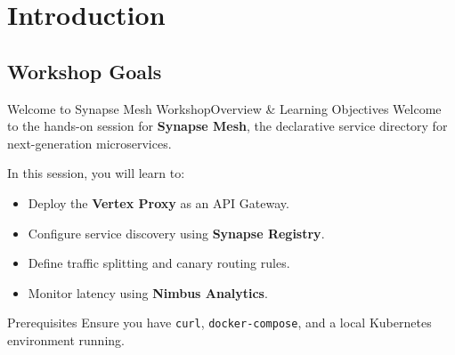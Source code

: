 \section{Introduction}
\subsection{Workshop Goals}

\begin{frame}{Welcome to Synapse Mesh Workshop}{Overview \& Learning Objectives}
  Welcome to the hands-on session for \textbf{Synapse Mesh}, the declarative service directory for next-generation microservices.
  
  \vspace{0.3cm}
  In this session, you will learn to:
  \begin{itemize}
    \item Deploy the \textbf{Vertex Proxy} as an API Gateway.
    \item Configure service discovery using \textbf{Synapse Registry}.
    \item Define traffic splitting and canary routing rules.
    \item Monitor latency using \textbf{Nimbus Analytics}.
  \end{itemize}
  
  \vspace{0.4cm}
  \begin{alertbox}{Prerequisites}
    Ensure you have \texttt{curl}, \texttt{docker-compose}, and a local Kubernetes environment running.
  \end{alertbox}
\end{frame}
